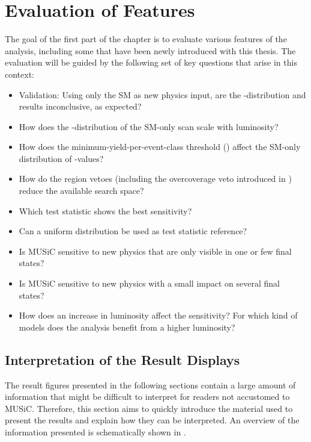 \section{Evaluation of Features}
The goal of the first part of the chapter is to evaluate various features of the analysis, including some that have been newly introduced with this thesis. The evaluation will be guided by the following set of key questions that arise in this context:
\begin{itemize}
    \setlength{\parskip}{0.5em}
    \setlength{\itemsep}{0ex}
    \item Validation: Using only the \ac{SM} as new physics input, are the \ptilde-distribution and \phat results inconclusive, as expected?
    \item How does the \ptilde-distribution of the \ac{SM}-only scan scale with luminosity?
    \item How does the minimum-yield-per-event-class threshold () affect the \ac{SM}-only distribution of \ptilde-values?
    \item How do the region vetoes (including the overcoverage veto introduced in ) reduce the available search space?
    \item Which test statistic \TSphat shows the best sensitivity?
    \item Can a uniform distribution be used as test statistic reference?
    \item Is \ac{MUSiC} sensitive to new physics that are only visible in one or few final states?
    \item Is \ac{MUSiC} sensitive to new physics with a small impact on several final states?    
    \item How does an increase in luminosity affect the sensitivity? For which kind of models does the analysis benefit from a higher luminosity?
\end{itemize}

\subsection{Interpretation of the Result Displays}
\label{sec:how_to_read_plots}

The result figures presented in the following sections contain a large amount of information that might be difficult to interpret for readers not accustomed to \ac{MUSiC}. Therefore, this section aims to quickly introduce the material used to present the results and explain how they can be interpreted. An overview of the information presented is schematically shown in .


